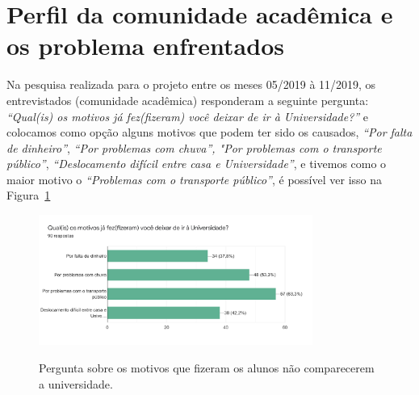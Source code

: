 \section{Perfil da comunidade acadêmica e os problema enfrentados}

Na pesquisa realizada para o projeto entre os meses 05/2019 à 11/2019, os entrevistados (comunidade acadêmica) responderam a seguinte pergunta: \textit{“Qual(is) os motivos já fez(fizeram) você deixar de ir à Universidade?”} e colocamos como opção alguns motivos que podem ter sido os causados, \textit{“Por falta de dinheiro”}, \textit{“Por problemas com chuva”, "Por problemas com o transporte público”}, \textit{“Deslocamento difícil entre casa e Universidade”}, e tivemos como o maior motivo o \textit{“Problemas com o transporte público”}, é possível ver isso na Figura~\ref{fig:dadosmeiodetransporte}%
%
\begin{figure}[!hbtp]
	\centering
	\caption{Pergunta sobre os motivos que fizeram os alunos não comparecerem a universidade.}
	\includegraphics[width=0.8\textwidth]{./04-figuras/questionario/1.png}
	\label{fig:dadosmeiodetransporte}
\end{figure}

